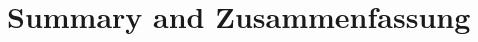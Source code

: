\documentclass[12pt,oneside,openright,a4paper]{report}
\begin{document}
\setcounter{chapter}{5}
\chapter{Summary and Zusammenfassung} 



\end{document}
